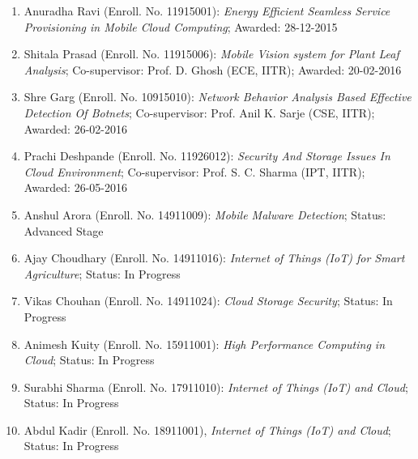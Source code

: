 \begin{enumerate}[label=(PHD\arabic*).]	
		\item Anuradha Ravi (Enroll. No. 11915001): \textit{Energy Efficient Seamless Service Provisioning in Mobile Cloud Computing}; Awarded: 28-12-2015
		\item Shitala Prasad (Enroll. No. 11915006): \textit{Mobile Vision system for Plant Leaf Analysis}; Co-supervisor: Prof. D. Ghosh (ECE, IITR); Awarded: 20-02-2016
		\item Shre Garg (Enroll. No. 10915010): \textit{Network Behavior Analysis Based Effective Detection Of Botnets}; Co-supervisor: Prof. Anil K. Sarje (CSE, IITR); Awarded: 26-02-2016
		\item Prachi Deshpande (Enroll. No. 11926012): \textit{Security And Storage Issues In Cloud Environment}; Co-supervisor: Prof. S. C. Sharma (IPT, IITR); Awarded: 26-05-2016
					\item Anshul Arora (Enroll. No. 14911009): \textit{Mobile Malware Detection}; Status: Advanced Stage
			\item Ajay Choudhary (Enroll. No. 14911016): \textit{Internet of Things (IoT) for Smart Agriculture}; Status: In Progress
			\item Vikas Chouhan (Enroll. No. 14911024): \textit{Cloud Storage Security}; Status: In Progress
			\item Animesh Kuity (Enroll. No. 15911001): \textit{High Performance Computing in Cloud};	Status: In Progress	 	
			\item Surabhi Sharma (Enroll. No. 17911010): \textit{Internet of Things (IoT) and Cloud}; Status: In Progress	
						\item Abdul Kadir (Enroll. No. 18911001), \textit{Internet of Things (IoT) and Cloud}; Status: In Progress
			\end{enumerate}